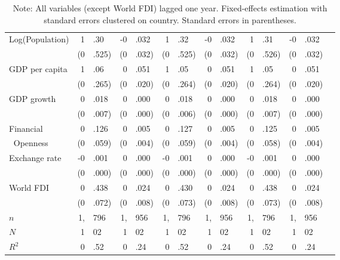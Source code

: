 \documentclass[12pt,onesided]{amsart}
\begin{document}
\begin{table}[ht]
{\begin{tabular}{lr@{} lr@{}lr@{}lr@{}lr@{}lr@{}lr@{} }
	\multirow{2}{*}{Log(Population)} & 1&.30 & -0&.032 & 1&.32 & -0&.032 & 1&.31 & -0&.032 \\
	& (0&.525) & (0&.032) & (0&.525) & (0&.032) & (0&.526) & (0&.032) \\
	\multirow{2}{*}{GDP per capita} & 1&.06 & 0&.051 & 1&.05 & 0&.051 & 1&.05 & 0&.051 \\
	& (0&.265) & (0&.020) & (0&.264) & (0&.020) & (0&.264) & (0&.020) \\
	\multirow{2}{*}{GDP growth} & 0&.018 & 0&.000 & 0&.018 & 0&.000 & 0&.018 & 0&.000 \\
	& (0&.007) & (0&.000) & (0&.006) & (0&.000) & (0&.007) &(0&.000) \\
	Financial & 0&.126 & 0&.005 & 0&.127 & 0&.005 & 0&.125 & 0&.005 \\
	$\;\;$Openness & (0&.059) & (0&.004) & (0&.059) & (0&.004) & (0&.058) &(0&.004) \\
	\multirow{2}{*}{Exchange rate} & -0&.001 & 0&.000 & -0&.001 & 0&.000 & -0&.001 & 0&.000 \\
	& (0&.000) & (0&.000) & (0&.000) & (0&.000) & (0&.000) &(0&.000) \\	
	\multirow{2}{*}{World FDI} & 0&.438 & 0&.024 & 0&.430 & 0&.024 & 0&.438 & 0&.024 \\
	& (0&.072) & (0&.008) & (0&.073) & (0&.008) & (0&.073) &(0&.008) \\ \hline
	$n$ & 1,&796 & 1,&956 & 1,&796 & 1,&956 & 1,&796 & 1,&956 \\
	$N$ & 1&02 & 1&02 & 1&02 & 1&02 & 1&02 & 1&02 \\
	$R^{2}$ & 0&.52 & 0&.24 & 0&.52 & 0&.24 & 0&.52 & 0&.24 \\
	\hline\hline
\end{tabular}
\caption*{Note: All variables (except World FDI) lagged one year. Fixed-effects estimation with standard errors clustered on country. Standard errors in parentheses. }
}
\end{table}
\FloatBarrier

\end{document}
